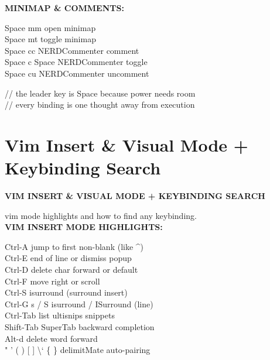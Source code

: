 \documentclass[11pt,a4paper,twoside]{book}
\begin{document}
\vspace{12pt}
{\bfseries\color{neonyellow} MINIMAP \& COMMENTS:}\vspace{4pt}

Space mm              open minimap\\
Space mt              toggle minimap\\
Space cc              NERDCommenter comment\\
Space c Space         NERDCommenter toggle\\
Space cu              NERDCommenter uncomment\\

\begin{codebox}
\color{neongreen}// the leader key is Space because power needs room\\
\color{neongreen}// every binding is one thought away from execution\\
\end{codebox}


\vspace{16pt}

\section{Vim Insert \& Visual Mode + Keybinding Search}


\vspace{10pt}
{\large\bfseries\color{neoncyan} VIM INSERT \& VISUAL MODE + KEYBINDING SEARCH}\vspace{6pt}

vim mode highlights and how to find any keybinding.\\


\vspace{12pt}
{\bfseries\color{neonyellow} VIM INSERT MODE HIGHLIGHTS:}\vspace{4pt}

Ctrl-A                jump to first non-blank (like \textasciicircum{})\\
Ctrl-E                end of line or dismiss popup\\
Ctrl-D                delete char forward or default\\
Ctrl-F                move right or scroll\\
Ctrl-S                isurround (surround insert)\\
Ctrl-G s / S          isurround / ISurround (line)\\
Ctrl-Tab              list ultisnips snippets\\
Shift-Tab             SuperTab backward completion\\
Alt-d                 delete word forward\\
" ' ( ) [ ] \textbackslash{}` \{ \}    delimitMate auto-pairing\\
\end{document}
